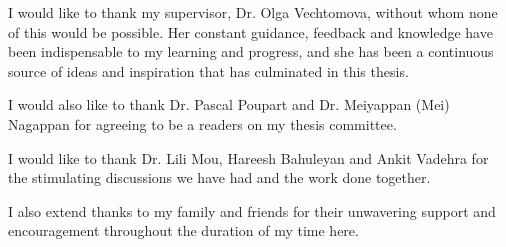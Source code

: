 I would like to thank my supervisor, Dr. Olga Vechtomova, without whom none of this would be possible. Her constant guidance, feedback and knowledge have been indispensable to my learning and progress, and she has been a continuous source of ideas and inspiration that has culminated in this thesis.

I would also like to thank Dr. Pascal Poupart and Dr. Meiyappan (Mei) Nagappan for agreeing to be a readers on my thesis committee.

I would like to thank Dr. Lili Mou, Hareesh Bahuleyan and Ankit Vadehra for the stimulating discussions we have had and the work done together.

I also extend thanks to my family and friends for their unwavering support and encouragement throughout the duration of my time here.
